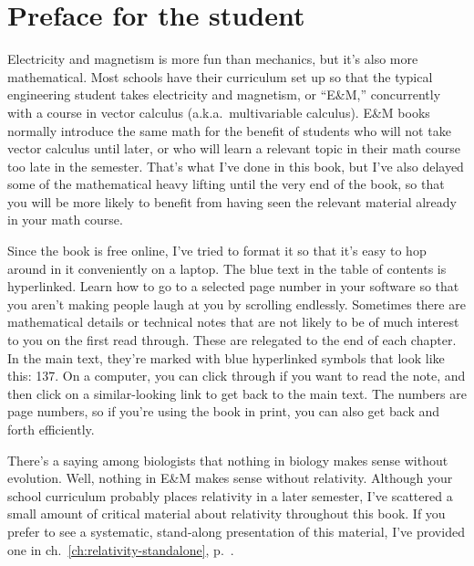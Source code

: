 \chapter{Preface for the student}%

Electricity and magnetism is more fun than mechanics, but it's
also more mathematical. Most schools have their curriculum set up
so that the typical engineering student takes electricity and magnetism,
or ``E\&M,'' concurrently with a course in vector calculus (a.k.a.~multivariable
calculus). E\&M books normally introduce the same math for the benefit of
students who will not take vector calculus until later, or who will learn
a relevant topic in their math course too late in the semester. That's
what I've done in this book, but I've also delayed some of the mathematical
heavy lifting until the very end of the book, so that you will be more likely to
benefit from having seen the relevant material already in your math
course.

Since the book is free online, I've tried to format it so that it's
easy to hop around in it conveniently on a laptop. The blue text in the
table of contents is hyperlinked. Learn how to go to a selected page number
in your software so that you aren't making people laugh at you by scrolling
endlessly. Sometimes there are mathematical details or technical notes that
are not likely to be of much interest to you on the first read through.
These are relegated to the end of each chapter. In the main text, they're
marked with blue hyperlinked symbols that look like this: 
\dangerousbend{}137. On a computer, you can click through if you want to
read the note, and then click on a similar-looking link to get back to
the main text. The numbers are page numbers, so if you're using the book in print,
you can also get back and forth efficiently.

There's a saying among biologists that nothing in biology makes sense without
evolution. Well, nothing in E\&M makes sense without relativity. Although
your school curriculum probably places relativity in a later semester, I've
scattered a small amount of critical material about relativity throughout
this book. If you prefer to see a systematic, stand-along presentation of
this material, I've provided one in ch.~\ref{ch:relativity-standalone}, p.~\pageref{ch:relativity-standalone}.
